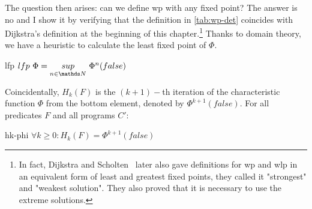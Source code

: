 The question then arises: can we define wp with any fixed point? 
The answer is no and I show it by verifying that the definition in \autoref{tab:wp-det} coincides with Dijkstra's definition at the beginning of this chapter.\footnote{In fact, Dijkstra and Scholten~\cite{dijkstra90} later also gave definitions for wp and wlp in an equivalent form of least and greatest fixed points, they called it "strongest" and "weakest solution". They also proved that it is necessary to use the extreme solutions. }
Thanks to domain theory, we have a heuristic to calculate the least fixed point of $\Phi$. 

\begin{theorem}{lfp}{\normalfont\cite{kaminski19}}
$lfp\ \Phi = \underset{n\in\N}{sup}\ \Phi^n(false)$
\end{theorem}


Coincidentally, $H_k(F)$ is the $(k+1)-$th iteration of the characteristic function $\Phi$ from the bottom element, denoted by $\Phi^{k+1}(false)$. 
For all predicates $F$ and all programs $C'$: 
\begin{lemma}{hk-phi}
$\forall k\geq 0: H_k(F)=\Phi^{k+1}(false)$
\end{lemma}

